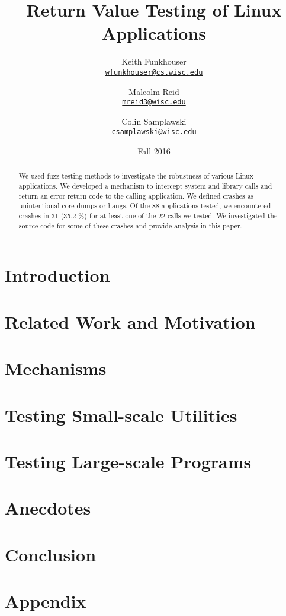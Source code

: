 \documentclass[10pt]{article}
\title{Return Value Testing of Linux Applications}
\author{Keith Funkhouser \\ \texttt{\href{mailto:wfunkhouser@cs.wisc.edu}{wfunkhouser@cs.wisc.edu}}
\and Malcolm Reid\\ \texttt{\href{mailto:mreid3@wisc.edu}{mreid3@wisc.edu}}
\and Colin Samplawski\\ \texttt{\href{mailto:csamplawski@wisc.edu}{csamplawski@wisc.edu}}
}
\date{Fall 2016}
\begin{document}
\setlength{\baselineskip}{18pt}
\maketitle

\begin{abstract}
\setlength{\baselineskip}{18pt}
We used fuzz testing methods to investigate the robustness of various Linux applications. We developed a mechanism to intercept system and library calls and return an error return code to the calling application. We defined crashes as unintentional core dumps or hangs. Of the 88 applications tested, we encountered crashes in 31 (35.2 \%) for at least one of the 22 calls we tested. We investigated the source code for some of these crashes and provide analysis in this paper. 
\end{abstract}

\section{Introduction}


\section{Related Work and Motivation}


\section{Mechanisms}




\section{Testing Small-scale Utilities}





\section{Testing Large-scale Programs}


\section{Anecdotes}


\section{Conclusion}




\newpage
\appendix
\section*{Appendix}
\lstset{numbers=left}




\end{document}
